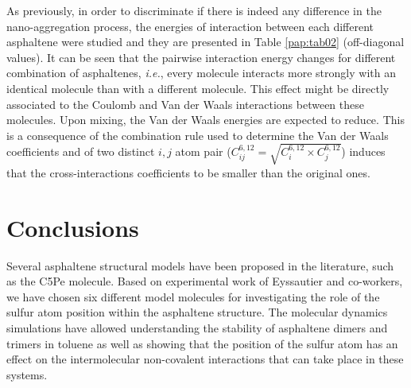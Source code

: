 As previously, in order to discriminate if there is indeed any difference in the nano-aggregation process, the energies of interaction between each different asphaltene were studied and they are presented in Table \ref{pap:tab02} (off-diagonal values). It can be seen that the pairwise interaction energy changes for different combination of asphaltenes, \textit{i.e.}, every molecule interacts more strongly with an identical molecule than with a different molecule. This effect might be directly associated to the Coulomb and Van der Waals interactions between these molecules. Upon mixing, the Van der Waals energies are expected to reduce. This is a consequence of the combination rule used to determine the Van der Waals coefficients  and  of two distinct $i,j$ atom pair ($C^{6,12}_{ij}=\sqrt{C^{6,12}_i \times C^{6,12}_j}$) induces that the cross-interactions coefficients to be smaller than the original ones. 

\section{Conclusions}

Several asphaltene structural models have been proposed in the literature, such as the C5Pe molecule. Based on experimental work of Eyssautier and co-workers,\cite{eyssautier2011insight} we have chosen six different model molecules for investigating the role of the sulfur atom position within the asphaltene structure. The molecular dynamics simulations have allowed understanding the stability of asphaltene dimers and trimers in toluene as well as showing that the position of the sulfur atom has an effect on the intermolecular non-covalent interactions that can take place in these systems.\\ 

